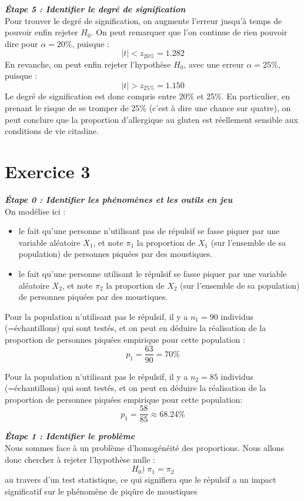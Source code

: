 \documentclass[a4paper,oneside,12pt]{article}
\theoremstyle{plain}
\begin{document}
    
    
\textit{\textbf{Étape 5 : Identifier le degré de signification}}\\
Pour trouver le degré de signification, on augmente l'erreur jusqu'à temps de pouvoir enfin rejeter $H_0$. On peut remarquer que l'on continue de rien pouvoir dire pour $\alpha = 20\%$, puisque :
$$|t|< z_{20\%} = 1.282$$
En revanche, on peut enfin rejeter l'hypothèse $H_0$, avec une erreur $\alpha = 25\%$, puisque :
$$|t|> z_{25\%} = 1.150$$
Le degré de signification est donc compris entre 20\% et 25\%. En particulier, en prenant le risque de se tromper de 25\% (c'est à dire une chance sur quatre), on peut conclure que la proportion d'allergique au gluten est réellement sensible aux conditions de vie citadine.\\



\section*{Exercice 3}


\textit{\textbf{Étape 0 : Identifier les phénomènes et les outils en jeu}}\\
On modélise ici :
\begin{itemize}
    \item le fait qu'une personne n'utilisant pas de répulsif se fasse piquer par une variable aléatoire $X_1$, et note $\pi_1$ la proportion de $X_1$ (sur l'ensemble de sa population) de personnes piquées par des moustiques.
    \item le fait qu'une personne utilisant le répulsif se fasse piquer par une variable aléatoire $X_2$, et note $\pi_2$ la proportion de $X_2$ (sur l'ensemble de sa population) de personnes piquées par des moustiques.
\end{itemize}
    
Pour la population n'utilisant pas le répulsif, il y a $n_1 = 90$ individus (=échantillons) qui sont testés, et on peut en déduire la réalisation de la proportion de personnes piquées empirique pour cette population :
$$p_1 = \frac{63}{90} = 70\%$$
    
Pour la population n'utilisant pas le répulsif, il y a $n_2 = 85$ individus (=échantillons) qui sont testés, et on peut en déduire la réalisation de la proportion de personnes piquées empirique pour cette population:
$$p_1 = \frac{58}{85}\approx 68.24\%$$
    
\textit{\textbf{Étape 1 : Identifier le problème}}\\
Nous sommes face à un problème d'homogénéité des proportions. Nous allons donc chercher à rejeter l'hypothèse nulle :
$$H_0) \;\pi_1=\pi_2$$ 
au travers d'un test statistique, ce qui signifiera que le répulsif a un impact significatif sur le phénomène de piqûre de moustiques\\
    
\end{document}
